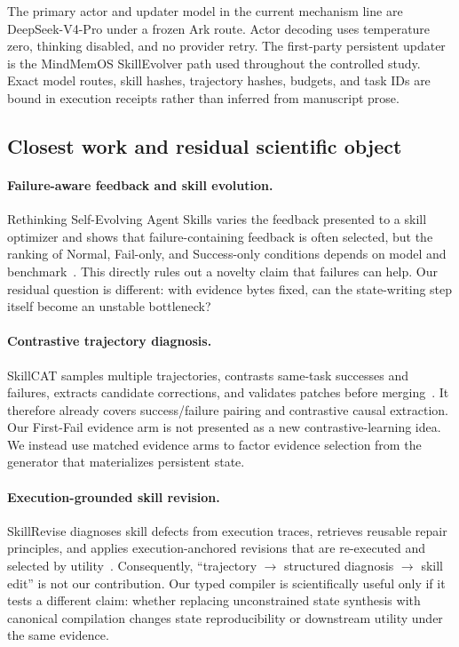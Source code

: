The primary actor and updater model in the current mechanism line are DeepSeek-V4-Pro under a frozen Ark route. Actor decoding uses temperature zero, thinking disabled, and no provider retry. The first-party persistent updater is the MindMemOS SkillEvolver path used throughout the controlled study. Exact model routes, skill hashes, trajectory hashes, budgets, and task IDs are bound in execution receipts rather than inferred from manuscript prose.

\subsection{Closest work and residual scientific object}

\paragraph{Failure-aware feedback and skill evolution.}
Rethinking Self-Evolving Agent Skills varies the feedback presented to a skill optimizer and shows that failure-containing feedback is often selected, but the ranking of Normal, Fail-only, and Success-only conditions depends on model and benchmark~\citep{liu2026rethinkskill}. This directly rules out a novelty claim that failures can help. Our residual question is different: with evidence bytes fixed, can the state-writing step itself become an unstable bottleneck?

\paragraph{Contrastive trajectory diagnosis.}
SkillCAT samples multiple trajectories, contrasts same-task successes and failures, extracts candidate corrections, and validates patches before merging~\citep{chen2026skillcat}. It therefore already covers success/failure pairing and contrastive causal extraction. Our First-Fail evidence arm is not presented as a new contrastive-learning idea. We instead use matched evidence arms to factor evidence selection from the generator that materializes persistent state.

\paragraph{Execution-grounded skill revision.}
SkillRevise diagnoses skill defects from execution traces, retrieves reusable repair principles, and applies execution-anchored revisions that are re-executed and selected by utility~\citep{liu2026skillrevise}. Consequently, ``trajectory $\rightarrow$ structured diagnosis $\rightarrow$ skill edit'' is not our contribution. Our typed compiler is scientifically useful only if it tests a different claim: whether replacing unconstrained state synthesis with canonical compilation changes state reproducibility or downstream utility under the same evidence.

